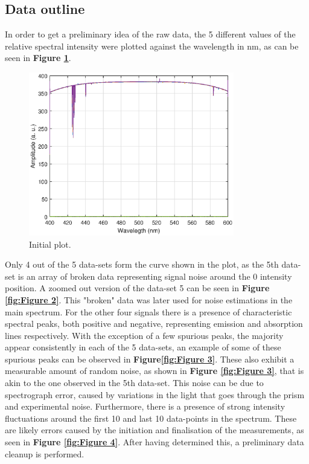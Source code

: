 \subsection{Data outline}
In order to get a preliminary idea of the raw data, the 5 different values of the relative spectral intensity were plotted against the wavelength in nm,   as can be seen in \textbf{Figure \ref{fig:Figure 1}}.
\begin{figure}[H]
    \centering
    \includegraphics[width = 0.8\textwidth ]{figures/InitialPlot.eps}
    \caption{Initial plot. }
    \label{fig:Figure 1}
\end{figure}
Only 4 out of the 5 data-sets form the curve shown in the plot, as the 5th data-set is an array of broken data representing signal noise around the 0 intensity position. A zoomed out version of the data-set 5 can be seen in \textbf{Figure \ref{fig:Figure 2}}. This "broken" data was later used for noise estimations in the main spectrum. For the other four signals there is a presence of characteristic spectral peaks, both positive and negative, representing emission and absorption lines respectively. With the exception of a few spurious peaks, the majority appear consistently in each of the 5 data-sets, an example of some of these spurious peaks can be observed in \textbf{Figure\ref{fig:Figure 3}}. These also exhibit a measurable amount of random noise, as shown in \textbf{Figure \ref{fig:Figure 3}}, that is akin to the one observed in the 5th data-set. This noise can be due to spectrograph error, caused by variations in the light that goes through the prism and experimental noise\cite{Prisms}. Furthermore, there is a presence of strong intensity fluctuations around the first 10 and last 10 data-points in the spectrum. These are likely errors caused by the initiation and finalisation of the measurements, as seen in \textbf{Figure \ref{fig:Figure 4}}. After having determined this, a preliminary data cleanup is performed.



